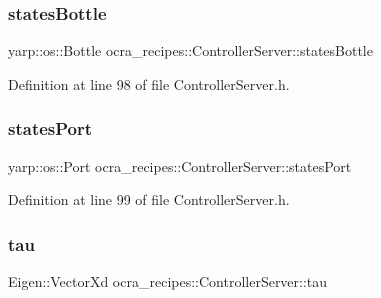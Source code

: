 \hypertarget{classocra__recipes_1_1ControllerServer_a587f8ef2bc028bf845b1713955def5a1}{}\label{classocra__recipes_1_1ControllerServer_a587f8ef2bc028bf845b1713955def5a1} 
\subsubsection{\texorpdfstring{states\+Bottle}{statesBottle}}
{\footnotesize\ttfamily yarp\+::os\+::\+Bottle ocra\+\_\+recipes\+::\+Controller\+Server\+::states\+Bottle\hspace{0.3cm}{\ttfamily [protected]}}



Definition at line 98 of file Controller\+Server.\+h.

\hypertarget{classocra__recipes_1_1ControllerServer_a1d314027131262206280be3e728bf59f}{}\label{classocra__recipes_1_1ControllerServer_a1d314027131262206280be3e728bf59f} 
\subsubsection{\texorpdfstring{states\+Port}{statesPort}}
{\footnotesize\ttfamily yarp\+::os\+::\+Port ocra\+\_\+recipes\+::\+Controller\+Server\+::states\+Port\hspace{0.3cm}{\ttfamily [protected]}}



Definition at line 99 of file Controller\+Server.\+h.

\hypertarget{classocra__recipes_1_1ControllerServer_a07e10b62b84a999c14843662a378ec0f}{}\label{classocra__recipes_1_1ControllerServer_a07e10b62b84a999c14843662a378ec0f} 
\subsubsection{\texorpdfstring{tau}{tau}}
{\footnotesize\ttfamily Eigen\+::\+Vector\+Xd ocra\+\_\+recipes\+::\+Controller\+Server\+::tau\hspace{0.3cm}{\ttfamily [protected]}}



